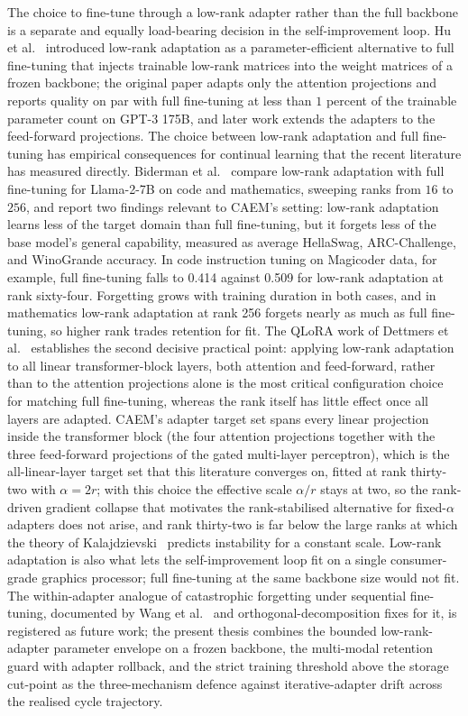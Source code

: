 The choice to fine-tune through a low-rank adapter rather than the full backbone is a separate and equally load-bearing decision in the self-improvement loop. Hu et al.~\cite{hu2022lora} introduced low-rank adaptation as a parameter-efficient alternative to full fine-tuning that injects trainable low-rank matrices into the weight matrices of a frozen backbone; the original paper adapts only the attention projections and reports quality on par with full fine-tuning at less than $1$ percent of the trainable parameter count on GPT-3 175B, and later work extends the adapters to the feed-forward projections. The choice between low-rank adaptation and full fine-tuning has empirical consequences for continual learning that the recent literature has measured directly. Biderman et al.~\cite{biderman2024lora} compare low-rank adaptation with full fine-tuning for Llama-2-7B on code and mathematics, sweeping ranks from $16$ to $256$, and report two findings relevant to CAEM's setting: low-rank adaptation learns less of the target domain than full fine-tuning, but it forgets less of the base model's general capability, measured as average HellaSwag, ARC-Challenge, and WinoGrande accuracy. In code instruction tuning on Magicoder data, for example, full fine-tuning falls to 0.414 against 0.509 for low-rank adaptation at rank sixty-four. Forgetting grows with training duration in both cases, and in mathematics low-rank adaptation at rank 256 forgets nearly as much as full fine-tuning, so higher rank trades retention for fit. The QLoRA work of Dettmers et al.~\cite{dettmers2023qlora} establishes the second decisive practical point: applying low-rank adaptation to all linear transformer-block layers, both attention and feed-forward, rather than to the attention projections alone is the most critical configuration choice for matching full fine-tuning, whereas the rank itself has little effect once all layers are adapted. CAEM's adapter target set spans every linear projection inside the transformer block (the four attention projections together with the three feed-forward projections of the gated multi-layer perceptron), which is the all-linear-layer target set that this literature converges on, fitted at rank thirty-two with $\alpha=2r$; with this choice the effective scale $\alpha/r$ stays at two, so the rank-driven gradient collapse that motivates the rank-stabilised alternative for fixed-$\alpha$ adapters does not arise, and rank thirty-two is far below the large ranks at which the theory of Kalajdzievski~\cite{kalajdzievski2023rslora} predicts instability for a constant scale. Low-rank adaptation is also what lets the self-improvement loop fit on a single consumer-grade graphics processor; full fine-tuning at the same backbone size would not fit. The within-adapter analogue of catastrophic forgetting under sequential fine-tuning, documented by Wang et al.~\cite{wang2023olora} and orthogonal-decomposition fixes for it, is registered as future work; the present thesis combines the bounded low-rank-adapter parameter envelope on a frozen backbone, the multi-modal retention guard with adapter rollback, and the strict training threshold above the storage cut-point as the three-mechanism defence against iterative-adapter drift across the realised cycle trajectory.

